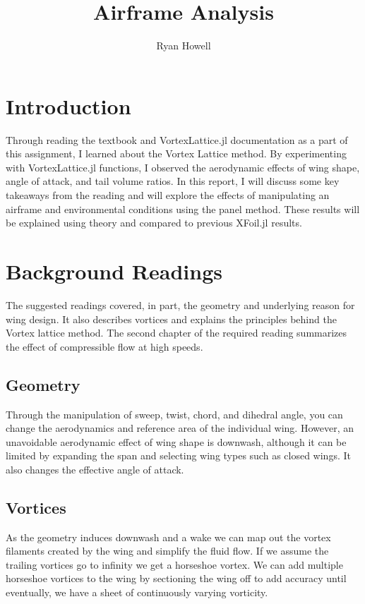 \documentclass{article}
\title{Airframe Analysis}
\author{Ryan Howell}
\begin{document}
\maketitle



\section{Introduction}

Through reading the textbook and VortexLattice.jl documentation as a part of this assignment, I learned about the Vortex Lattice method. By experimenting with VortexLattice.jl functions, I observed the aerodynamic effects of wing shape, angle of attack, and tail volume ratios. In this report, I will discuss some key takeaways from the reading and will explore the effects of manipulating an airframe and environmental conditions using the panel method. These results will be explained using theory and compared to previous XFoil.jl results.

\section{Background Readings}
The suggested readings covered, in part, the geometry and underlying reason for wing design. It also describes vortices and explains the principles behind the Vortex lattice method. The second chapter of the required reading summarizes the effect of compressible flow at high speeds. 

\subsection{Geometry}
Through the manipulation of sweep, twist, chord, and dihedral angle, you can change the aerodynamics and reference area of the individual wing. However, an unavoidable aerodynamic effect of wing shape is downwash, although it can be limited by expanding the span and selecting wing types such as closed wings. It also changes the effective angle of attack.

\subsection{Vortices}
As the geometry induces downwash and a wake we can map out the vortex filaments created by the wing and simplify the fluid flow. If we assume the trailing vortices go to infinity we get a horseshoe vortex. We can add multiple horseshoe vortices to the wing by sectioning the wing off to add accuracy until eventually, we have a sheet of continuously varying vorticity. 
\end{document}
